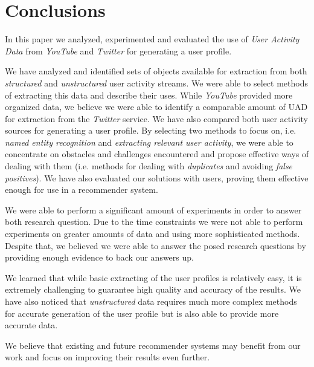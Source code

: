 \section{Conclusions}

In this paper we analyzed, experimented and evaluated the use of \textit{User Activity Data} from \textit{YouTube}
and \textit{Twitter} for generating a user profile.

We have analyzed and identified sets of objects available for extraction from both \textit{structured} and
\textit{unstructured} user activity streams. We were able to select methods of extracting this data and describe
their uses. While \textit{YouTube} provided more organized data, we believe we were able to identify a comparable
amount of UAD for extraction from the \textit{Twitter} service.
We have also compared both user activity sources for generating a user profile. By selecting two methods to focus
on, i.e. \textit{named entity recognition} and \textit{extracting relevant user activity}, we were able to concentrate
on obstacles and challenges encountered and propose effective ways of dealing with them (i.e. methods for dealing with
\textit{duplicates} and avoiding \textit{false positives}). We have also evaluated our solutions with users, proving
them effective enough for use in a recommender system.

We were able to perform a significant amount of experiments in order to answer both research question. Due to the time
constraints we were not able to perform experiments on greater amounts of data and using more sophisticated methods.
Despite that, we believed we were able to answer the posed research questions by providing enough evidence to back our
answers up.

We learned that while basic extracting of the user profiles is relatively easy, it is extremely challenging to
guarantee high quality and accuracy of the results. We have also noticed that \textit{unstructured} data requires
much more complex methods for accurate generation of the user profile but is also able to provide more
accurate data.

We believe that existing and future recommender systems may benefit from our work and focus on improving their results
even further.
